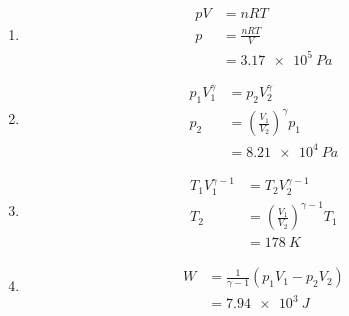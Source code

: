 \documentclass{article}
\begin{document}
\begin{enumerate}
  \item

        \begin{align*}
          p V & = n R T            \\
          p   & = \frac{n R T}{V}  \\
              & = \qty{3.17e5}{Pa}
        \end{align*}

  \item

        \begin{align*}
          p_1 V_1^\gamma & = p_2 V_2^\gamma                            \\
          p_2            & = \left( \frac{V_1}{V_2} \right)^\gamma p_1 \\
                         & = \qty{8.21e4}{Pa}
        \end{align*}

  \item

        \begin{align*}
          T_1 V_1^{\gamma - 1} & = T_2 V_2^{\gamma - 1}                            \\
          T_2                  & = \left( \frac{V_1}{V_2} \right)^{\gamma - 1} T_1 \\
                               & = \qty{178}{K}
        \end{align*}

  \item

        \begin{align*}
          W & = \frac{1}{\gamma - 1} (p_1 V_1 - p_2 V_2) \\
            & = \qty{7.94e3}{J}
        \end{align*}
\end{enumerate}

\subsubsection{}
\end{document}

